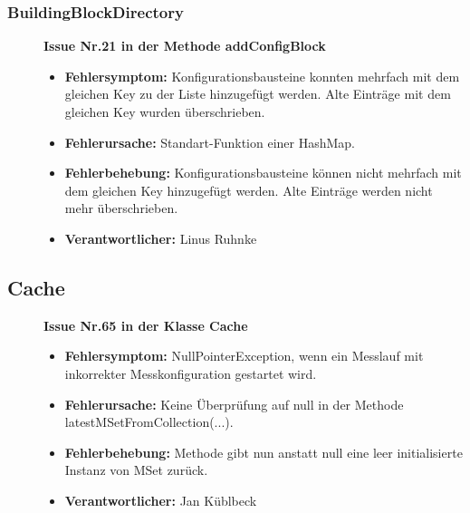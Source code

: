 \documentclass[parskip=full]{scrartcl}
\begin{document}
\subsubsection{BuildingBlockDirectory}

\begin{description}

\item []\textbf{Issue Nr.21 in der Methode addConfigBlock} 

\begin{itemize}
\item []\textbf{Fehlersymptom:} Konfigurationsbausteine konnten mehrfach mit dem gleichen Key zu der Liste hinzugefügt werden. Alte Einträge mit dem gleichen Key wurden überschrieben.
\item []\textbf{Fehlerursache:} Standart-Funktion einer HashMap.
\item []\textbf{Fehlerbehebung:} Konfigurationsbausteine können nicht mehrfach mit dem gleichen Key hinzugefügt werden. Alte Einträge werden nicht mehr überschrieben.
\item []\textbf{Verantwortlicher:} Linus Ruhnke
\end{itemize}

\end{description}


\clearpage
\subsection{Cache}

\begin{description}

\item []\textbf{Issue Nr.65 in der Klasse Cache} 

\begin{itemize}
\item []\textbf{Fehlersymptom:} NullPointerException, wenn ein Messlauf mit inkorrekter Messkonfiguration gestartet wird.
\item []\textbf{Fehlerursache:} Keine Überprüfung auf null in der Methode latestMSetFromCollection(...).
\item []\textbf{Fehlerbehebung:} Methode gibt nun anstatt null eine leer initialisierte Instanz von MSet zurück.
\item []\textbf{Verantwortlicher:} Jan Küblbeck
\end{itemize}

\end{description}
\end{document}
